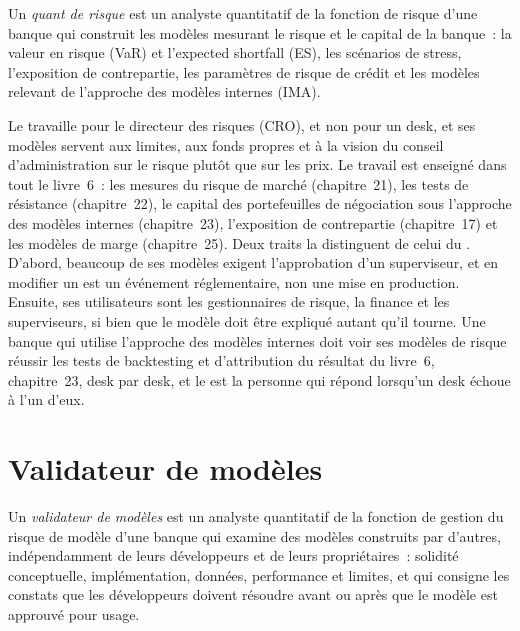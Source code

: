 \begin{definition}\label{def:in:bank-quant:risk}
Un \emph{quant de risque} est un analyste quantitatif de la fonction de risque d'une banque qui construit les modèles
mesurant le risque et le capital de la banque~: la valeur en risque (VaR) et l'expected shortfall (ES), les scénarios de stress, l'exposition de contrepartie,
les paramètres de risque de crédit et les modèles relevant de l'approche des modèles internes (IMA).
\end{definition}

Le  travaille pour le directeur des risques (CRO), et non pour un desk, et ses modèles servent aux limites, aux fonds propres et à la vision du
conseil d'administration sur le risque plutôt que sur les prix. Le travail est enseigné dans tout le livre~6~: les mesures du risque de marché (chapitre~21), les tests de résistance
(chapitre~22), le capital des portefeuilles de négociation sous l'approche des modèles internes (chapitre~23), l'exposition de contrepartie
(chapitre~17) et les modèles de marge (chapitre~25). Deux traits la distinguent de celui du . D'abord, beaucoup de ses
modèles exigent l'approbation d'un superviseur, et en modifier un est un événement réglementaire, non une mise en production. Ensuite, ses utilisateurs sont
les gestionnaires de risque, la finance et les superviseurs, si bien que le modèle doit être expliqué autant qu'il tourne. Une banque qui utilise l'approche des
modèles internes doit voir ses modèles de risque réussir les tests de backtesting et d'attribution du résultat du livre~6,
chapitre~23, desk par desk, et le  est la personne qui répond lorsqu'un desk échoue à l'un d'eux.

\section{Validateur de modèles}

\begin{definition}\label{def:in:bank-quant:validator}
Un \emph{validateur de modèles} est un analyste quantitatif de la fonction de gestion du risque de modèle d'une banque qui
examine des modèles construits par d'autres, indépendamment de leurs développeurs et de leurs propriétaires~: solidité conceptuelle, implémentation,
données, performance et limites, et qui consigne les constats que les développeurs doivent résoudre avant ou après que le modèle est
approuvé pour usage.
\end{definition}


